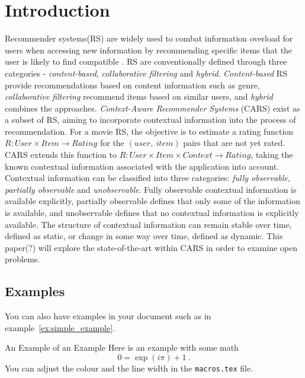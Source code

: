 \chapter{Introduction}\label{ch:introduction}
Recommender systems(RS) are widely used to combat information overload for users when accessing new information by recommending specific items that the user is likely to find compatible \cite{YouTubeNeural,IndustryPerspective}.
RS are conventionally defined through three categories - \textit{content-based}, \textit{collaborative filtering} and \textit{hybrid}.
\textit{Content-based} RS provide recommendations based on content information such as genre, \textit{collaborative filtering} recommend items based on similar users, and \textit{hybrid} combines the approaches\cite{ContextSurvey2020}.
\textit{Context-Aware Recommender Systems} (CARS) exist as a subset of RS, aiming to incorporate contextual information into the process of recommendation.
For a movie RS, the objective is to estimate a rating function $R: User \times Item \rightarrow Rating$ for the $(user, \ item)$ pairs that are not yet rated\cite[p.~191-227]{RecommenderHandbook2015}.
CARS extends this function to $R: User \times Item \times Context \rightarrow Rating$, taking the known contextual information associated with the application into account.
Contextual information can be classified into three categories: \textit{fully observable}, \textit{partially observable} and \textit{unobservable}.
Fully observable contextual information is available explicitly, partially observable defines that only some of the information is available, and unobservable defines that no contextual information is explicitly available.
The structure of contextual information can remain stable over time, defined as static, or change in some way over time, defined as dynamic.
This paper(?) will explore the state-of-the-art within CARS in order to examine open problems.

\section{Examples}
You can also have examples in your document such as in example~\ref{ex:simple_example}.
\begin{example}{An Example of an Example}
  \label{ex:simple_example}
  Here is an example with some math
  \begin{equation}
    0 = \exp(i\pi)+1\ .
  \end{equation}
  You can adjust the colour and the line width in the {\tt macros.tex} file.
\end{example}

